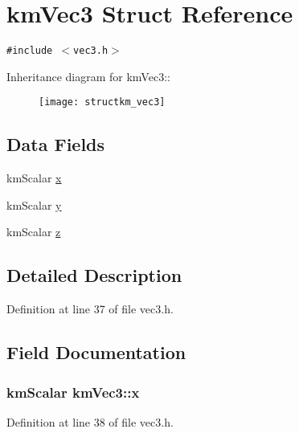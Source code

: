 \hypertarget{structkm_vec3}{
\section{kmVec3 Struct Reference}
\label{structkm_vec3}
}
{\tt \#include $<$vec3.h$>$}

Inheritance diagram for kmVec3::\begin{figure}[H]
\begin{center}
\leavevmode
\texttt{[image: structkm\_vec3]}
\end{center}
\end{figure}
\subsection*{Data Fields}
\begin{CompactItemize}
\item 
kmScalar \hyperlink{structkm_vec3_800c3571e905feddc73453c652be72fb}{x}
\item 
kmScalar \hyperlink{structkm_vec3_45906c9d76262c5a9dd1c3774ee937eb}{y}
\item 
kmScalar \hyperlink{structkm_vec3_539514eaeee81aaeee3bb90f7a1581af}{z}
\end{CompactItemize}


\subsection{Detailed Description}


Definition at line 37 of file vec3.h.

\subsection{Field Documentation}
\hypertarget{structkm_vec3_800c3571e905feddc73453c652be72fb}{
\subsubsection[x]{\setlength{\rightskip}{0pt plus 5cm}kmScalar {\bf kmVec3::x}}}
\label{structkm_vec3_800c3571e905feddc73453c652be72fb}




Definition at line 38 of file vec3.h.

